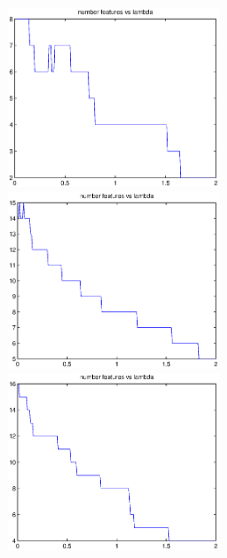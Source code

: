 \documentclass{article}
\theoremstyle{definition}
\theoremstyle{definition}
\theoremstyle{remark}
\begin{document}
\begin{figure}[!htbp]
\begin{minipage}[t]{0.3\linewidth}
\centering
\includegraphics[width=2.2in]{s4.eps}
\end{minipage}%
\begin{minipage}[t]{0.3\linewidth}
\centering
\includegraphics[width=2.2in]{m4.eps}
\end{minipage}
\begin{minipage}[t]{0.3\linewidth}
\centering
\includegraphics[width=2.2in]{l4.eps}
\end{minipage}
\end{figure}
\end{document}
